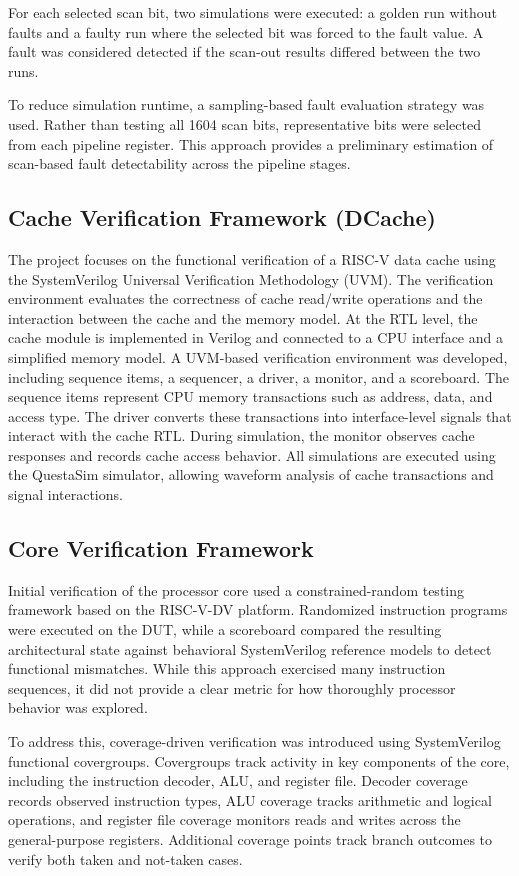 \documentclass[conference]{IEEEtran}
\begin{document}
For each selected scan bit, two simulations were executed: a golden run without faults and a faulty run where the selected bit was forced to the fault value. A fault was considered detected if the scan-out results differed between the two runs.

To reduce simulation runtime, a sampling-based fault evaluation strategy was used. Rather than testing all 1604 scan bits, representative bits were selected from each pipeline register. This approach provides a preliminary estimation of scan-based fault detectability across the pipeline stages.

\subsection{Cache Verification Framework (DCache)}
The project focuses on the functional verification of a RISC-V data cache using the SystemVerilog Universal Verification Methodology (UVM). The verification environment evaluates the correctness of cache read/write operations and the interaction between the cache and the memory model.
At the RTL level, the cache module is implemented in Verilog and connected to a CPU interface and a simplified memory model. 
A UVM-based verification environment was developed, including sequence items, a sequencer, a driver, a monitor, and a scoreboard. The sequence items represent CPU memory transactions such as address, data, and access type. The driver converts these transactions into interface-level signals that interact with the cache RTL. During simulation, the monitor observes cache responses and records cache access behavior.
All simulations are executed using the QuestaSim simulator, allowing waveform analysis of cache transactions and signal interactions.

\subsection{Core Verification Framework}
Initial verification of the processor core used a constrained-random testing framework based on the RISC-V-DV platform. Randomized instruction programs were executed on the DUT, while a scoreboard compared the resulting architectural state against behavioral SystemVerilog reference models to detect functional mismatches. While this approach exercised many instruction sequences, it did not provide a clear metric for how thoroughly processor behavior was explored.

To address this, coverage-driven verification was introduced using SystemVerilog functional covergroups. Covergroups track activity in key components of the core, including the instruction decoder, ALU, and register file. Decoder coverage records observed instruction types, ALU coverage tracks arithmetic and logical operations, and register file coverage monitors reads and writes across the general-purpose registers. Additional coverage points track branch outcomes to verify both taken and not-taken cases.
\end{document}
